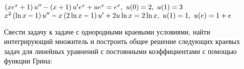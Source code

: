\begin{enumtasks}
		\itemstar \( \left( x e^x + 1 \right) u'' - \left( x + 1 \right) u' e^x + u e^x = e^x, ~ u(0) = 2, ~ u(1) = 3 \) %
		\itemstar \( x^2 \left( \ln{x} - 1 \right) u'' - x \left( 2 \ln{x} - 1 \right) u' + 2 u \ln{x} = 2 \ln{x}, ~ u(1) = 1, ~ u(e) = 1 + e \) %

	\end{enumtasks}

	Свести задачу к задаче с однородными краевыми условиями, найти интегрирующий множитель и построить общее решение следующих краевых задач для линейных уравнений с постоянными коэффициентами с помощью функции Грина:
